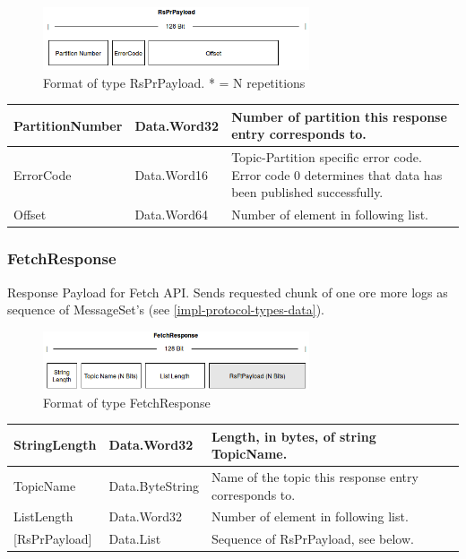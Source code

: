\begin{figure}[H]
    \centering
    \includegraphics[width=0.7\textwidth]{images/impl-prot-types-prPayload.png}
    \caption{Format of type RsPrPayload. * = N repetitions}
    \label{fig:impl-prot-types-prPayload}
\end{figure}


\begin{table}[H]
\centering
\begin{tabular}{ l  l  p{10cm} }
\hline
PartitionNumber & Data.Word32 & Number of partition this response entry
corresponds to.                                                \\ \hline
ErrorCode       & Data.Word16 & Topic-Partition specific error code. Error code
0 determines that data has been published successfully. \\ \hline
Offset          & Data.Word64 & Number of element in following list.
\\ \hline
\end{tabular}
\end{table}

\subsubsection{FetchResponse}
Response Payload for Fetch API. Sends requested chunk of one ore more logs as
sequence of MessageSet's (see \ref{impl-protocol-types-data}). 

\begin{figure}[H]
    \centering
    \includegraphics[width=0.7\textwidth]{images/impl-prot-types-fetchResponse.png}
    \caption{Format of type FetchResponse}
    \label{fig:impl-prot-types-fetchResponse}
\end{figure}

\begin{table}[H]
\centering
\begin{tabular}{ l  l  p{10cm} }
\hline
StringLength      & Data.Word32     & Length, in bytes, of string TopicName. \\ \hline
TopicName         & Data.ByteString & Name of the topic this response entry corresponds to.\\ \hline
ListLength        & Data.Word32     & Number of element in following list.\\ \hline
{[}RsPrPayload{]} & Data.List       & Sequence of RsPrPayload, see below.
\\ \hline
\end{tabular}
\end{table}

